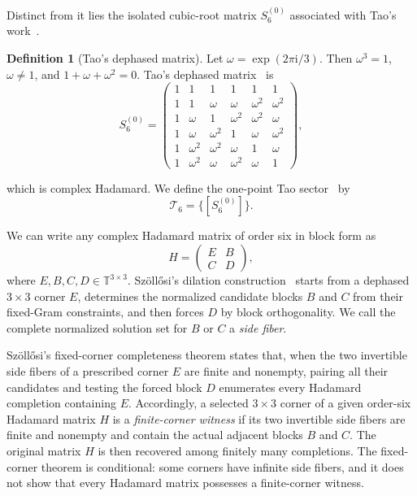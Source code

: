 \documentclass[aps,prx,reprint,nofootinbib,twoside,superscriptaddress,longbibliography,floatfix]{revtex4-2}
\theoremstyle{definition}
\newtheorem{definition}[theorem]{Definition}
\newcommand{\T}{\mathbb T}
\newcommand{\I}{\mathrm i}
\begin{document}

Distinct from it lies the isolated cubic-root matrix $S_6^{(0)}$ associated with Tao's work~\cite{Tao2004,TadejZyczkowski2006,Szollosi2012FourParameter,Tadej2008}. \begin{definition}[Tao's dephased matrix]
Let $\omega=\exp(2\pi\I/3)$. Then $\omega^3=1$, $\omega\ne1$, and $1+\omega+\omega^2=0$. Tao's dephased matrix~\cite{Tao2004} is
\begin{equation}
S_6^{(0)}=
\begin{pmatrix}
1&1&1&1&1&1\\
1&1&\omega&\omega&\omega^2&\omega^2\\
1&\omega&1&\omega^2&\omega^2&\omega\\
1&\omega&\omega^2&1&\omega&\omega^2\\
1&\omega^2&\omega^2&\omega&1&\omega\\
1&\omega^2&\omega&\omega^2&\omega&1
\end{pmatrix},
\label{eq:taomatrix}
\end{equation}
\end{definition}
which is complex Hadamard. We define the one-point Tao sector~\cite{Tao2004} by
\begin{equation}
\mathcal T_6=\{[S_6^{(0)}]\}.
\label{eq:Taosector}
\end{equation}

We can write any complex Hadamard matrix of order six in block form as
\begin{equation}
H=
\begin{pmatrix}
E&B\\
C&D
\end{pmatrix},
\label{eq:blockform}
\end{equation}
where $E,B,C,D\in\T^{3\times3}$. Sz\"oll\H{o}si's dilation construction~\cite{Szollosi2012FourParameter} starts from a dephased $3\times3$ corner $E$, determines the normalized candidate blocks $B$ and $C$ from their fixed-Gram constraints, and then forces $D$ by block orthogonality. We call the complete normalized solution set for $B$ or $C$ a \emph{side fiber}.

Sz\"oll\H{o}si's fixed-corner completeness theorem states that, when the two invertible side fibers of a prescribed corner $E$ are finite and nonempty, pairing all their candidates and testing the forced block $D$ enumerates every Hadamard completion containing $E$. Accordingly, a selected $3\times3$ corner of a given order-six Hadamard matrix $H$ is a \emph{finite-corner witness} if its two invertible side fibers are finite and nonempty and contain the actual adjacent blocks $B$ and $C$. The original matrix $H$ is then recovered among finitely many completions.
The fixed-corner theorem is conditional: some corners have infinite side fibers, and it does not show that every Hadamard matrix possesses a finite-corner witness. 
\end{document}
